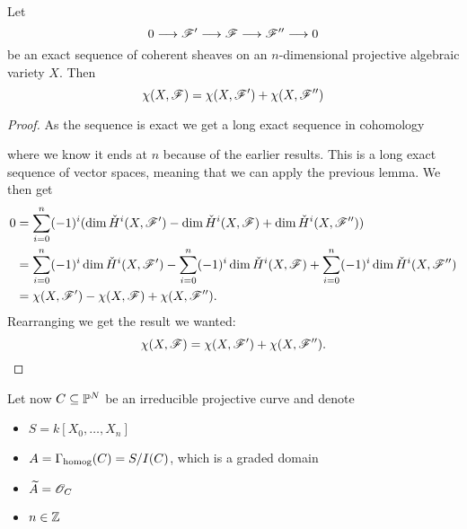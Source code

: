 \begin{proposition}
Let
\begin{equation*}
    0 \longrightarrow \F' \longrightarrow \F \longrightarrow \F'' \longrightarrow 0
\end{equation*}
be an exact sequence of coherent sheaves on an $n$-dimensional projective algebraic variety $X$. Then 
\begin{equation*}
    \chi(X,\F) = \chi(X,\F')+\chi(X,\F'')
\end{equation*}
\end{proposition}
\begin{proof}
As the sequence is exact we get a long exact sequence in \Cech cohomology
\begin{center}
\end{center}
where we know it ends at $n$ because of the earlier results. This is a long exact sequence of vector spaces, meaning that we can apply the previous lemma. We then get
\begin{align*}
    0&=\sum_{i=0}^{n}(-1)^{i}(\dim\cH^i(X,\F')-\dim\cH^i(X,\F)+\dim\cH^i(X,\F'')) \\
    &= \sum_{i=0}^{n}(-1)^{i}\dim\cH^i(X,\F') - \sum_{i=0}^{n}(-1)^{i}\dim\cH^i(X,\F) + \sum_{i=0}^{n}(-1)^{i}\dim\cH^i(X,\F'') \\
    &= \chi(X,\F')-\chi(X,\F) + \chi(X,\F'').
\end{align*}
Rearranging we get the result we wanted:
\begin{equation*}
    \chi(X,\F) = \chi(X,\F')+ \chi(X,\F'').
\end{equation*}
\end{proof}

Let now $C\subseteq \P^N$ be an irreducible projective curve and denote 
\begin{itemize}
    \item $S = k[X_0, \ldots, X_n]$
    \item $A = \Gh(C) = S/I(C)$, which is a graded domain
    \item $\widetilde{A} = \O_C$
    \item $n \in \Z$
\end{itemize}

